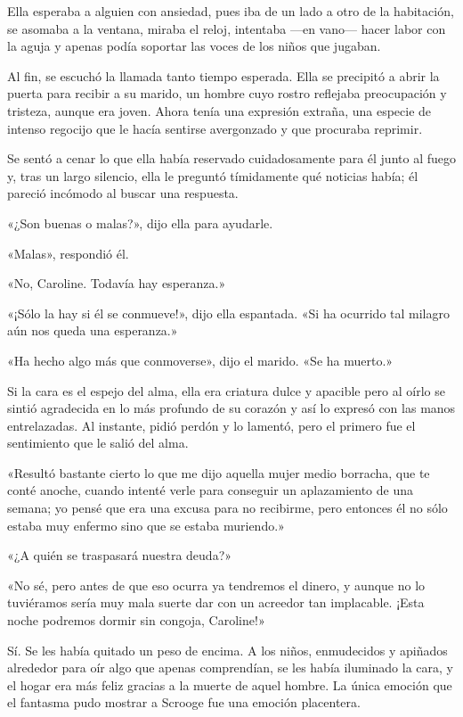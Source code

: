 \documentclass{novela}
\begin{document}
 Ella esperaba a alguien con ansiedad, pues iba de un lado a otro de la habitación, se asomaba a la ventana, miraba el reloj, intentaba ---en vano--- hacer labor con la aguja y apenas podía soportar las voces de los niños que jugaban.

 Al fin, se escuchó la llamada tanto tiempo esperada. Ella se precipitó a abrir la puerta para recibir a su marido, un hombre cuyo rostro reflejaba preocupación y tristeza, aunque era joven. Ahora tenía una expresión extraña, una especie de intenso regocijo que le hacía sentirse avergonzado y que procuraba reprimir.

 Se sentó a cenar lo que ella había reservado cuidadosamente para él junto al fuego y, tras un largo silencio, ella le preguntó tímidamente qué noticias había; él pareció incómodo al buscar una respuesta.

 «¿Son buenas o malas?», dijo ella para ayudarle.

 «Malas», respondió él.

 «No, Caroline. Todavía hay esperanza.»

 «¡Sólo la hay si él se conmueve!», dijo ella espantada. «Si ha ocurrido tal milagro aún nos queda una esperanza.»

 «Ha hecho algo más que conmoverse», dijo el marido. «Se ha muerto.»

 Si la cara es el espejo del alma, ella era criatura dulce y apacible pero al oírlo se sintió agradecida en lo más profundo de su corazón y así lo expresó con las manos entrelazadas. Al instante, pidió perdón y lo lamentó, pero el primero fue el sentimiento que le salió del alma.

 «Resultó bastante cierto lo que me dijo aquella mujer medio borracha, que te conté anoche, cuando intenté verle para conseguir un aplazamiento de una semana; yo pensé que era una excusa para no recibirme, pero entonces él no sólo estaba muy enfermo sino que se estaba muriendo.»

 «¿A quién se traspasará nuestra deuda?»

 «No sé, pero antes de que eso ocurra ya tendremos el dinero, y aunque no lo tuviéramos sería muy mala suerte dar con un acreedor tan implacable. ¡Esta noche podremos dormir sin congoja, Caroline!»

 Sí. Se les había quitado un peso de encima. A los niños, enmudecidos y apiñados alrededor para oír algo que apenas comprendían, se les había iluminado la cara, y el hogar era más feliz gracias a la muerte de aquel hombre. La única emoción que el fantasma pudo mostrar a Scrooge fue una emoción placentera.
\end{document}

